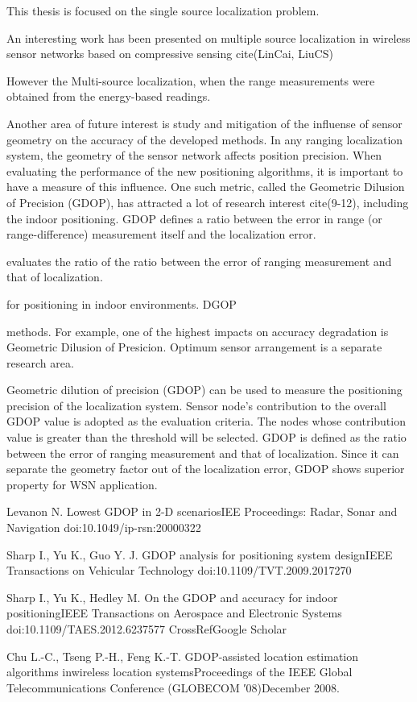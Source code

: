 This thesis is focused on the single source localization problem. 

An interesting work has been presented on multiple source localization in wireless sensor networks based on compressive sensing cite(LinCai, LiuCS)  

However the  
Multi-source localization, when the range measurements were obtained from the energy-based readings. 

Another area of future interest is study and mitigation of the influense of sensor geometry on the accuracy of the developed methods. In any ranging localization system, the geometry of the sensor network  affects position precision.   When evaluating the performance of the new positioning algorithms, it is important to  have a measure of this influence. One such metric, called the Geometric Dilusion of Precision (GDOP), has attracted a lot of research interest cite(9-12), including the indoor positioning. GDOP defines a ratio between the error in range (or range-difference) measurement itself and the localization error.

evaluates the ratio  of the  ratio between the error of ranging measurement and that of localization.

 for positioning in indoor  environments. DGOP 

methods. For example, one of the highest impacts on accuracy degradation is Geometric Dilusion of Presicion. Optimum sensor arrangement is a separate research area. 

Geometric dilution of precision (GDOP) can be used to measure the positioning precision of the localization system. 
Sensor node's contribution to the overall GDOP value is adopted as the evaluation criteria. The nodes whose contribution value is greater than the threshold will be selected. 
GDOP is defined as the ratio between the error of ranging measurement and that of localization. Since it can separate the geometry factor out of the localization error, GDOP shows superior property for WSN application. 



    Levanon N.
Lowest GDOP in 2-D scenariosIEE Proceedings: Radar, Sonar and Navigation
doi:10.1049/ip-rsn:20000322



    Sharp I., Yu K., Guo Y. J.
GDOP analysis for positioning system designIEEE Transactions on Vehicular Technology
doi:10.1109/TVT.2009.2017270



    Sharp I., Yu K., Hedley M.
On the GDOP and accuracy for indoor positioningIEEE Transactions on Aerospace and Electronic Systems
doi:10.1109/TAES.2012.6237577
CrossRefGoogle Scholar


    Chu L.-C., Tseng P.-H., Feng K.-T.
GDOP-assisted location estimation algorithms inwireless location systemsProceedings of the IEEE Global Telecommunications Conference (GLOBECOM ′08)December 2008.
